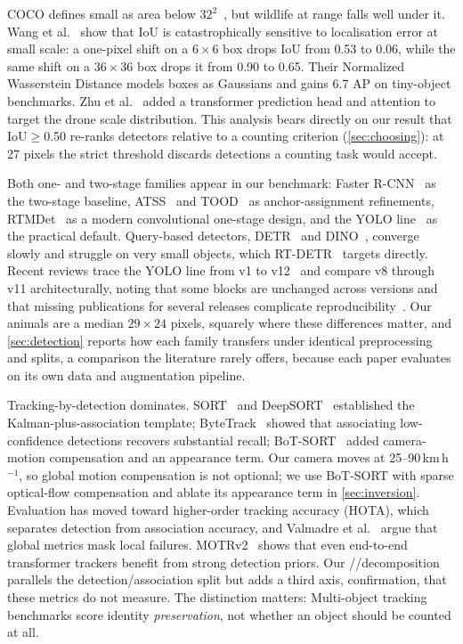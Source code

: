 \label{sec:rw:detect}

COCO defines small as area below $32^2$~\cite{lin2014coco}, but wildlife at range falls well
under it. Wang et al.~\cite{wang2021nwd} show that IoU is catastrophically sensitive to
localisation error at small scale: a one-pixel shift on a $6\times6$ box drops IoU from 0.53 to
0.06, while the same shift on a $36\times36$ box drops it from 0.90 to 0.65. Their Normalized
Wasserstein Distance models boxes as Gaussians and gains 6.7 AP on tiny-object benchmarks. Zhu
et al.~\cite{zhu2021tph} added a transformer prediction head and attention to target the drone
scale distribution. This analysis bears directly on our result that IoU$\geq$0.50 re-ranks
detectors relative to a counting criterion (\cref{sec:choosing}): at 27 pixels the strict
threshold discards detections a counting task would accept.

Both one- and two-stage families appear in our benchmark: Faster R-CNN~\cite{ren2015faster} as
the two-stage baseline, ATSS~\cite{zhang2020atss} and TOOD~\cite{feng2021tood} as
anchor-assignment refinements, RTMDet~\cite{lyu2022rtmdet} as a modern convolutional one-stage
design, and the YOLO line~\cite{redmon2016yolo,wang2024yolov9,wang2024yolov10} as the practical
default. Query-based detectors, DETR~\cite{carion2020detr} and DINO~\cite{zhang2023dino}, converge slowly and struggle on very small objects, which RT-DETR~\cite{zhao2024rtdetr} targets
directly. Recent reviews trace the YOLO line from v1 to v12~\cite{sapkota2025yoloreview} and
compare v8 through v11 architecturally, noting that some blocks are unchanged across versions
and that missing publications for several releases complicate
reproducibility~\cite{hidayatullah2025yolov8}. Our animals are a median $29\times24$ pixels,
squarely where these differences matter, and \cref{sec:detection} reports how each family
transfers under identical preprocessing and splits, a comparison the literature rarely
offers, because each paper evaluates on its own data and augmentation pipeline.

Tracking-by-detection dominates. SORT~\cite{bewley2016sort} and
DeepSORT~\cite{wojke2017deepsort} established the Kalman-plus-association template;
ByteTrack~\cite{zhang2022bytetrack} showed that associating low-confidence detections recovers
substantial recall; BoT-SORT~\cite{aharon2022botsort} added camera-motion compensation and an
appearance term. Our camera moves at 25--90\,km\,h$^{-1}$, so global motion compensation is not
optional; we use BoT-SORT with sparse optical-flow compensation and ablate its appearance term
in \cref{sec:inversion}. Evaluation has moved toward higher-order tracking accuracy (HOTA), which separates detection from
association accuracy, and Valmadre et al.~\cite{valmadre2021local} argue that global metrics
mask local failures. MOTRv2~\cite{zhang2023motrv2} shows that even end-to-end transformer
trackers benefit from strong detection priors. Our \reachedq/\primaryq/\countedq decomposition
parallels the detection/association split but adds a third axis, confirmation, that these
metrics do not measure. The distinction matters: Multi-object tracking benchmarks score identity
\emph{preservation}, not whether an object should be counted at all.

